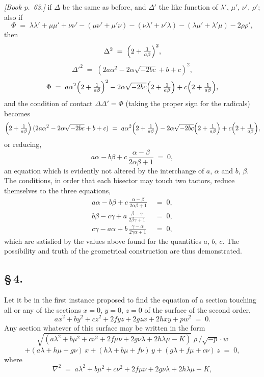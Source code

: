 \documentclass[11pt]{article}
\begin{document}
\bigskip

\noindent\emph{[Book p.~63.]} if $\Delta$ be the same as before, and $\Delta'$ the like function of $\lambda'$, $\mu'$, $\nu'$, $\rho'$; also if
\[
\Phi \;=\; \lambda\lambda' + \mu\mu' + \nu\nu' - (\mu\nu' + \mu'\nu) - (\nu\lambda' + \nu'\lambda) - (\lambda\mu' + \lambda'\mu) - 2\rho\rho',
\]
then
\[
\Delta^{2} \;=\; \Bigl(2 + \tfrac{1}{a\beta}\Bigr)^{2},
\]
\[
\Delta'^{2} \;=\; (2a\alpha^{2} - 2\alpha\sqrt{-2bc} + b + c)^{2},
\]
\[
\Phi \;=\; a\alpha^{2}\Bigl(2 + \tfrac{1}{a\beta}\Bigr)^{2} - 2\alpha\sqrt{-2bc}\Bigl(2 + \tfrac{1}{a\beta}\Bigr) + c\Bigl(2 + \tfrac{1}{a\beta}\Bigr),
\]
and the condition of contact $\Delta\Delta' = \Phi$ (taking the proper sign for the radicals) becomes
\[
\Bigl(2 + \tfrac{1}{a\beta}\Bigr)\,(2a\alpha^{2} - 2\alpha\sqrt{-2bc} + b + c) \;=\; a\alpha^{2}\Bigl(2 + \tfrac{1}{a\beta}\Bigr) - 2\alpha\sqrt{-2bc}\Bigl(2 + \tfrac{1}{a\beta}\Bigr) + c\Bigl(2 + \tfrac{1}{a\beta}\Bigr),
\]
or reducing,
\[
a\alpha - b\beta + c\,\frac{\alpha - \beta}{2\alpha\beta + 1} \;=\; 0,
\]
an equation which is evidently not altered by the interchange of $a$, $\alpha$ and $b$, $\beta$. The conditions, in order that each bisector may touch two tactors, reduce themselves to the three equations,
\begin{align*}
a\alpha - b\beta + c\,\frac{\alpha - \beta}{2\alpha\beta + 1} &\;=\; 0,\\
b\beta - c\gamma + a\,\frac{\beta - \gamma}{2\beta\gamma + 1} &\;=\; 0,\\
c\gamma - a\alpha + b\,\frac{\gamma - \alpha}{2\gamma\alpha + 1} &\;=\; 0,
\end{align*}
which are satisfied by the values above found for the quantities $a$, $b$, $c$. The possibility and truth of the geometrical construction are thus demonstrated.

\bigskip

\subsection*{\S\,4.}

Let it be in the first instance proposed to find the equation of a section touching all or any of the sections $x = 0$, $y = 0$, $z = 0$ of the surface of the second order,
\[
a x^{2} + b y^{2} + c z^{2} + 2 f y z + 2 g z x + 2 h x y + p w^{2} \;=\; 0.
\]
Any section whatever of this surface may be written in the form
\[
\sqrt{(a\lambda^{2} + b\mu^{2} + c\nu^{2} + 2f\mu\nu + 2g\nu\lambda + 2h\lambda\mu - K)}\;\rho\,/\sqrt{-p}\cdot w
\]
\[
+ (a\lambda + h\mu + g\nu)\,x + (h\lambda + b\mu + f\nu)\,y + (g\lambda + f\mu + c\nu)\,z \;=\; 0,
\]
where
\[
\nabla^{2} \;=\; a\lambda^{2} + b\mu^{2} + c\nu^{2} + 2f\mu\nu + 2g\nu\lambda + 2h\lambda\mu - K,
\]
\end{document}
